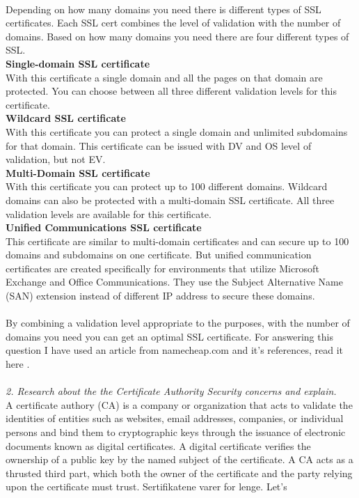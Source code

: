 \documentclass[12pt, letterpaper]{article}
\begin{document}
\\
Depending on how many domains you need there is different types of SSL certificates. Each SSL cert combines the level of validation with the number of domains. Based on how many domains you need there are four different types of SSL.
\\
\textbf{Single-domain SSL certificate}
\\
With this certificate a single domain and all the pages on that domain are protected. You can choose between all three different validation levels for this certificate.
\\
\textbf{Wildcard SSL certificate}
\\
With this certificate you can protect a single domain and unlimited subdomains for that domain. This certificate can be issued with DV and OS level of validation, but not EV.
\\
\textbf{Multi-Domain SSL certificate}
\\
With this certificate you can protect up to 100 different domains. Wildcard domains can also be protected with a multi-domain SSL certificate. All three validation levels are available for this certificate.
\\
\textbf{Unified Communications SSL certificate}
\\
This certificate are similar to multi-domain certificates and can secure up to 100 domains and subdomains on one certificate. But unified communication certificates are created specifically for environments that utilize Microsoft Exchange and Office Communications. They use the Subject Alternative Name (SAN) extension instead of different IP address to secure these domains.
\\\\
By combining a validation level appropriate to the purposes, with the number of domains you need you can get an optimal SSL certificate. For answering this question I have used an article from namecheap.com and it's references, read it here \cite{ssl}.
\\\\
\textit{2. Research about the the Certificate Authority Security concerns and explain.}\\
A certificate authory (CA) is a company or organization that acts to validate the identities of entities such as websites, email addresses, companies, or individual persons and bind them to cryptographic keys through the issuance of electronic documents known as digital certificates. A digital certificate verifies the ownership of a public key by the named subject of the certificate. A CA acts as a thrusted third part, which both the owner of the certificate and the party relying upon the certificate must trust. Sertifikatene varer for lenge. Let's 
\end{document}
